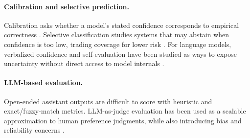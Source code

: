 \paragraph{Calibration and selective prediction.}
Calibration asks whether a model's stated confidence corresponds to empirical correctness \citep{guo2017calibration}. Selective classification studies systems that may abstain when confidence is too low, trading coverage for lower risk \citep{geifman2017selective}. For language models, verbalized confidence and self-evaluation have been studied as ways to expose uncertainty without direct access to model internals \citep{lin2022verbalized,kadavath2022know}.

\paragraph{LLM-based evaluation.}
Open-ended assistant outputs are difficult to score with heuristic and exact/fuzzy-match metrics. LLM-as-judge evaluation has been used as a scalable approximation to human preference judgments, while also introducing bias and reliability concerns \citep{zheng2023llmjudge}.